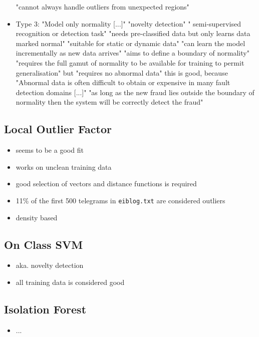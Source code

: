 \begin{itemize}
		\subitem "cannot always handle outliers from unexpected regions" \parencite{Hodge2004}
		\item Type 3: "Model only normality [...]" \parencite{Hodge2004}
		\subitem "novelty detection" \parencite{Hodge2004} " semi-supervised recognition or detection task" \parencite{Hodge2004}
		\subitem "needs pre-classified data but only learns data marked normal" \parencite{Hodge2004}
		\subitem "suitable for static or dynamic data" \parencite{Hodge2004}
		\subitem "can learn the model incrementally as new data arrives" \parencite{Hodge2004}
		\subitem "aims to define a boundary of normality" \parencite{Hodge2004}
		\subitem "requires the full gamut of normality to be available for training to permit generalisation" \parencite{Hodge2004} but "requires no abnormal data" \parencite{Hodge2004}
		\subitem this is good, because "Abnormal data is often difficult to obtain or expensive in many fault detection domains [...]" \parencite{Hodge2004}
		\subitem "as long as the new fraud lies outside the boundary of normality then the system will be correctly detect the fraud" \parencite{Hodge2004}
		
	\end{itemize}
	
	\subsection{Local Outlier Factor}
	\begin{itemize}
		\item seems to be a good fit
		\item works on unclean training data
		\item good selection of vectors and distance functions is required
		\item 11\% of the first 500 telegrams in \verb|eiblog.txt| are considered outliers
		\item density based
	\end{itemize}
	
	\subsection{On Class SVM}
	\begin{itemize}
		\item aka. novelty detection
		\item all training data is considered good
	\end{itemize}
	
	\subsection{Isolation Forest}
	\begin{itemize}
		\item ...
	\end{itemize}
	
